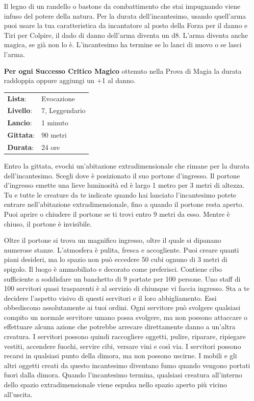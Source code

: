 \begin{multicols}{2}
Il legno di un randello o bastone da combattimento che stai impugnando viene infuso del potere della natura. Per la durata dell'incantesimo, usando quell'arma puoi usare la tua caratteristica da incantatore al posto della Forza per il danno e Tiri per Colpire, il dado di danno dell'arma diventa un d8. L'arma diventa anche magica, se già non lo è. L'incantesimo ha termine se lo lanci di nuovo o se lasci l'arma.

\textbf{Per ogni Successo Critico Magico} ottenuto nella Prova di Magia la durata raddoppia oppure aggiungi un +1 al danno.

\noindent\begin{tabularx}{\linewidth}{p{1.3cm}X}
	\rowcolor{gray!20}\textbf{Lista}: & Evocazione \\
	\textbf{Livello}: & 7, Leggendario \\
	\rowcolor{gray!20}\textbf{Lancio}: & 1 minuto \\
	\textbf{Gittata}: & 90 metri \\
	\rowcolor{gray!20}\textbf{Durata}: & 24 ore \\
\end{tabularx}\smallskip

Entro la gittata, evochi un'abitazione extradimensionale che rimane per la durata dell'incantesimo. Scegli dove è posizionato il suo portone d'ingresso. Il portone d'ingresso emette una lieve luminosità ed è largo 1 metro per 3 metri di altezza. Tu e tutte le creature da te indicate quando hai lanciato l'incantesimo potete entrare nell'abitazione extradimensionale, fino a quando il portone resta aperto. Puoi aprire o chiudere il portone se ti trovi entro 9 metri da esso. Mentre è chiuso, il portone è invisibile.

Oltre il portone si trova un magnifico ingresso, oltre il quale si dipanano numerose stanze. L'atmosfera è pulita, fresca e accogliente. Puoi creare quanti piani desideri, ma lo spazio non può eccedere 50 cubi ognuno di 3 metri di spigolo. Il luogo è ammobiliato e decorato come preferisci. Contiene cibo sufficiente a soddisfare un banchetto di 9 portate per 100 persone. Uno staff di 100 servitori quasi trasparenti è al servizio di chiunque vi faccia ingresso. Sta a te decidere l'aspetto visivo di questi servitori e il loro abbigliamento. Essi obbediscono assolutamente ai tuoi ordini. Ogni servitore può svolgere qualsiasi compito un normale servitore umano possa svolgere, ma non possono attaccare o effettuare alcuna azione che potrebbe arrecare direttamente danno a un'altra creatura. I servitori possono quindi raccogliere oggetti, pulire, riparare, ripiegare vestiti, accendere fuochi, servire cibi, versare vini e così via. I servitori possono recarsi in qualsiasi punto della dimora, ma non possono uscirne. I mobili e gli altri oggetti creati da questo incantesimo diventano fumo quando vengono portati fuori dalla dimora. Quando l'incantesimo termina, qualsiasi creatura all'interno dello spazio extradimensionale viene espulsa nello spazio aperto più vicino all'uscita.


\end{multicols}

